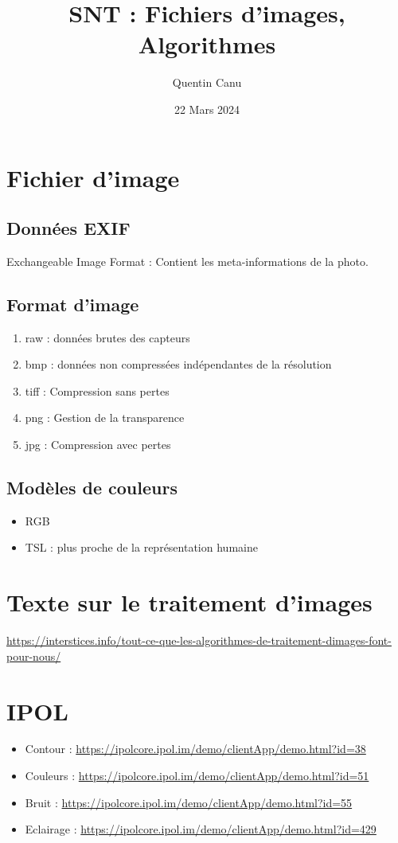 \documentclass{article}
\title{SNT : Fichiers d'images, Algorithmes}
\date{22 Mars 2024}
\author{Quentin Canu}
\begin{document}
\maketitle
\section{Fichier d'image}
\subsection*{Données EXIF}
Exchangeable Image Format : Contient les meta-informations de la photo.
\subsection*{Format d'image}
\begin{enumerate}
\item raw : données brutes des capteurs
\item bmp : données non compressées indépendantes de la résolution
\item tiff : Compression sans pertes
\item png : Gestion de la transparence
\item jpg : Compression avec pertes
\end{enumerate}
\subsection*{Modèles de couleurs}
\begin{itemize}
\item RGB
\item TSL : plus proche de la représentation humaine 
\end{itemize}

\section{Texte sur le traitement d'images}
\url{https://interstices.info/tout-ce-que-les-algorithmes-de-traitement-dimages-font-pour-nous/}
\section{IPOL}
\begin{itemize}
\item Contour : \url{https://ipolcore.ipol.im/demo/clientApp/demo.html?id=38}
\item Couleurs : \url{https://ipolcore.ipol.im/demo/clientApp/demo.html?id=51}
\item Bruit : \url{https://ipolcore.ipol.im/demo/clientApp/demo.html?id=55}
\item Eclairage : \url{https://ipolcore.ipol.im/demo/clientApp/demo.html?id=429}
\end{itemize}
\end{document}
